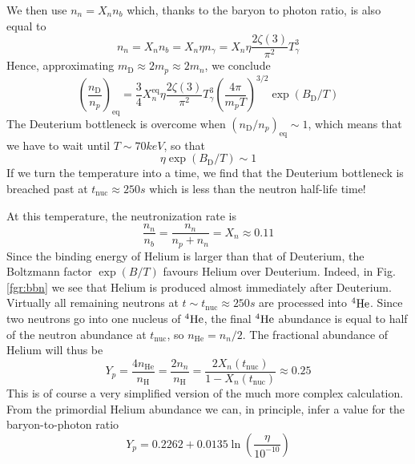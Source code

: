 \par We then use $n_{n} = X_{n}n_{b}$ which, thanks to the baryon to photon ratio, is also equal to
\begin{equation}
    n_{n} = X_{n}n_{b} = X_{n}\eta n_{\gamma} = X_{n}\eta \frac{2\zeta(3)}{\pi^{2}}T_{\gamma}^{3}
\end{equation}
Hence, approximating $m_{\text{D}}\approx 2m_{p}\approx 2m_{n}$, we conclude 
\begin{equation}
    \left(\frac{n_{\text{D}}}{n_{p}}\right)_{\text{eq}} = \frac{3}{4}X_{n}^{\text{eq}}\eta \frac{2\zeta(3)}{\pi^{2}}T_{\gamma}^{3} \left(\frac{4\pi}{m_{p}T}\right)^{3/2}\exp(B_{\text{D}}/T)
\end{equation}
The Deuterium bottleneck is overcome when $(n_{\text{D}}/n_{p})_{\text{eq}}\sim 1$, which means that we have to wait until $T \sim 70 \unit{keV}$, so that 
\begin{equation}
    \eta\exp(B_{\text{D}}/T) \sim 1
\end{equation}
If we turn the temperature into a time, we find that the Deuterium bottleneck is breached past at $t_{\text{nuc}} \approx 250\unit{s}$ which is less than the neutron half-life time!
\par At this temperature, the neutronization rate is 
\begin{equation}
    \frac{n_{n}}{n_{b}} = \frac{n_{n}}{n_{p}+n_{n}} = X_{n} \approx 0.11
\end{equation}
Since the binding energy of Helium is larger than that of Deuterium, the Boltzmann factor $\exp(B/T)$ favours Helium over Deuterium. Indeed, in Fig.\ref{fgr:bbn} we see that Helium is produced almost immediately after Deuterium. Virtually all remaining neutrons at $t \sim t_{\text{nuc}}\approx 250\unit{s}$ are processed into $\element{He}{4}{}$. Since two neutrons go into one nucleus of $\element{He}{4}{}$, the final $\element{He}{4}{}$ abundance is equal to half of the neutron abundance at $t_{\text{nuc}}$, so $n_{\text{He}} = n_{n}/2$. The fractional abundance of Helium will thus be 
\begin{equation}
    Y_{p} = \frac{4n_{\text{He}}}{n_{\text{H}}} = \frac{2n_{n}}{n_{\text{H}}} = \frac{2X_{n}(t_{\text{nuc}})}{1-X_{n}(t_{\text{nuc}})} \approx 0.25
\end{equation}
This is of course a very simplified version of the much more complex calculation. From the primordial Helium abundance we can, in principle, infer a value for the baryon-to-photon ratio 
\begin{equation}
    Y_{p} = 0.2262 + 0.0135\ln\left(\frac{\eta}{10^{-10}}\right)
\end{equation}

